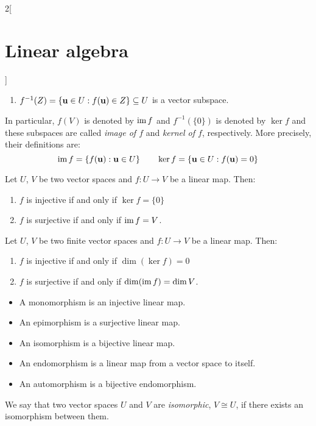 \documentclass[../../../main.tex]{subfiles}
\begin{document}
\begin{multicols}{2}[\section{Linear algebra}]
\begin{prop}
\begin{enumerate}
            \item $f^{-1}(Z)=\{\boldsymbol{\mathrm{u}}\in U: f(\boldsymbol{\mathrm{u}})\in Z\}\subseteq U$ is a vector subspace.
        \end{enumerate}
        In particular, $f(V)$ is denoted by $\operatorname{im} f$ and $f^{-1}(\{0\})$ is denoted by $\ker f$ and these subspaces are called \textit{image of $f$} and \textit{kernel of $f$}, respectively. More precisely, their definitions are:
        $$\operatorname{im} f=\{f(\boldsymbol{\mathrm{u}}): \boldsymbol{\mathrm{u}}\in U\}\qquad\ker f=\{\boldsymbol{\mathrm{u}}\in U: f(\boldsymbol{\mathrm{u}})=0\}$$
    \end{prop}
    \begin{prop}
        Let $U$, $V$ be two vector spaces and $f:U\rightarrow V$ be a linear map. Then:
        \begin{enumerate}
            \item $f$ is injective if and only if $\ker f=\{0\}$
            \item $f$ is surjective if and only if $\operatorname{im} f=V$.
        \end{enumerate}
    \end{prop}
    \begin{corollary}
        Let $U$, $V$ be two finite vector spaces and $f:U\rightarrow V$ be a linear map. Then:
        \begin{enumerate}
            \item $f$ is injective if and only if $\dim(\ker f)=0$
            \item $f$ is surjective if and only if $\dim(\operatorname{im} f)=\dim V$.
        \end{enumerate}
    \end{corollary}
    \begin{definition}
        \hfill
        \begin{itemize}
            \item A monomorphism is an injective linear map.
            \item An epimorphism is a surjective linear map.
            \item An isomorphism is a bijective linear map.
            \item An endomorphism is a linear map from a vector space to itself.
            \item An automorphism is a bijective endomorphism.
        \end{itemize}
    \end{definition}
    \begin{definition}
        We say that two vector spaces $U$ and $V$ are \textit{isomorphic}, $V\cong U$, if there exists an isomorphism between them.

\end{definition}
\end{multicols}
\end{document}
